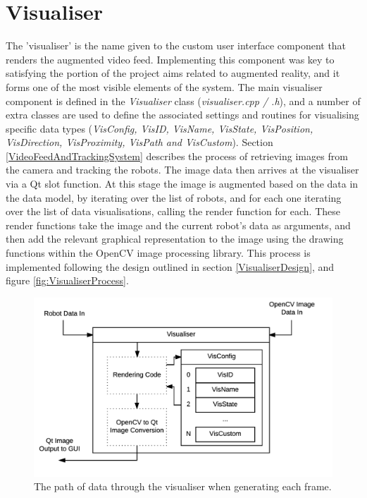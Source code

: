 
\section{Visualiser} \label{VisualiserImplementation}
The 'visualiser' is the name given to the custom user interface component that renders the augmented video feed. Implementing this component was key to satisfying the portion of the project aims related to augmented reality, and it forms one of the most visible elements of the system. The main visualiser component is defined in the \textit{Visualiser} class (\textit{visualiser.cpp / .h}), and a number of extra classes are used to define the associated settings and routines for visualising specific data types (\textit{VisConfig, VisID, VisName, VisState, VisPosition, VisDirection, VisProximity, VisPath and VisCustom}). Section \ref{VideoFeedAndTrackingSystem} describes the process of retrieving images from the camera and tracking the robots. The image data then arrives at the visualiser via a Qt slot function. At this stage the image is augmented based on the data in the data model, by iterating over the list of robots, and for each one iterating over the list of data visualisations, calling the render function for each. These render functions take the image and the current robot's data as arguments, and then add the relevant graphical representation to the image using the drawing functions within the OpenCV image processing library. This process is implemented following the design outlined in section \ref{VisualiserDesign}, and figure \ref{fig:VisualiserProcess}. 

\begin{figure}
	\centering
	\includegraphics[scale=1]{Figures/VisualiserDiagram.png}
	\decoRule
	\caption[Visualiser Data Flow]{The path of data through the visualiser when generating each frame.}
	\label{fig:VisualiserDiagram}
\end{figure}

